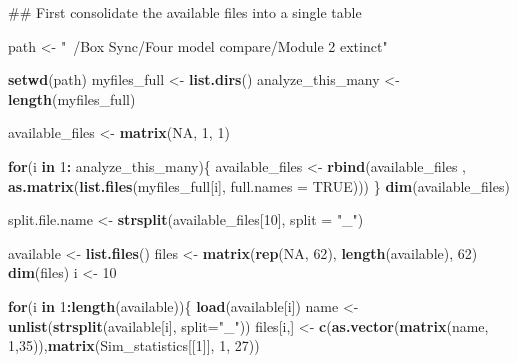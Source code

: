 \documentclass[]{book}
\newenvironment{Shaded}{\begin{snugshade}}{\end{snugshade}}
\newcommand{\KeywordTok}[1]{\textcolor[rgb]{0.13,0.29,0.53}{\textbf{{#1}}}}
\newcommand{\DataTypeTok}[1]{\textcolor[rgb]{0.13,0.29,0.53}{{#1}}}
\newcommand{\DecValTok}[1]{\textcolor[rgb]{0.00,0.00,0.81}{{#1}}}
\newcommand{\StringTok}[1]{\textcolor[rgb]{0.31,0.60,0.02}{{#1}}}
\newcommand{\OtherTok}[1]{\textcolor[rgb]{0.56,0.35,0.01}{{#1}}}
\newcommand{\ControlFlowTok}[1]{\textcolor[rgb]{0.13,0.29,0.53}{\textbf{{#1}}}}
\newcommand{\OperatorTok}[1]{\textcolor[rgb]{0.81,0.36,0.00}{\textbf{{#1}}}}
\newcommand{\NormalTok}[1]{{#1}}
\theoremstyle{definition}
\theoremstyle{definition}
\theoremstyle{remark}
\begin{document}
\begin{Shaded}
\begin{Highlighting}[]
\NormalTok{## First consolidate the available files into a single table}
    
\NormalTok{      path <-}\StringTok{ "~/Box Sync/Four model compare/Module 2 extinct"}
           
     
           \KeywordTok{setwd}\NormalTok{(path)}
\NormalTok{    myfiles_full <-}\StringTok{ }\KeywordTok{list.dirs}\NormalTok{()}
\NormalTok{    analyze_this_many <-}\StringTok{ }\KeywordTok{length}\NormalTok{(myfiles_full)}
    
\NormalTok{    available_files <-}\StringTok{ }\KeywordTok{matrix}\NormalTok{(}\OtherTok{NA}\NormalTok{, }\DecValTok{1}\NormalTok{, }\DecValTok{1}\NormalTok{)}
    
        
    \ControlFlowTok{for}\NormalTok{(i }\ControlFlowTok{in} \DecValTok{1}\OperatorTok{:}\StringTok{ }\NormalTok{analyze_this_many)\{}
\NormalTok{    available_files <-}\StringTok{ }\KeywordTok{rbind}\NormalTok{(available_files , }\KeywordTok{as.matrix}\NormalTok{(}\KeywordTok{list.files}\NormalTok{(myfiles_full[i], }\DataTypeTok{full.names =} \OtherTok{TRUE}\NormalTok{)))}
\NormalTok{    \}}
    \KeywordTok{dim}\NormalTok{(available_files)}
    
\NormalTok{    split.file.name <-}\StringTok{ }\KeywordTok{strsplit}\NormalTok{(available_files[}\DecValTok{10}\NormalTok{], }\DataTypeTok{split =} \StringTok{"_"}\NormalTok{) }
    
    
    
 
\NormalTok{available <-}\StringTok{ }\KeywordTok{list.files}\NormalTok{()}
\NormalTok{files <-}\StringTok{ }\KeywordTok{matrix}\NormalTok{(}\KeywordTok{rep}\NormalTok{(}\OtherTok{NA}\NormalTok{, }\DecValTok{62}\NormalTok{), }\KeywordTok{length}\NormalTok{(available), }\DecValTok{62}\NormalTok{)}
\KeywordTok{dim}\NormalTok{(files)}
\NormalTok{i <-}\StringTok{ }\DecValTok{10}


\ControlFlowTok{for}\NormalTok{(i }\ControlFlowTok{in} \DecValTok{1}\OperatorTok{:}\KeywordTok{length}\NormalTok{(available))\{}
\KeywordTok{load}\NormalTok{(available[i])}
\NormalTok{name <-}\StringTok{ }\KeywordTok{unlist}\NormalTok{(}\KeywordTok{strsplit}\NormalTok{(available[i], }\DataTypeTok{split=}\StringTok{"_"}\NormalTok{))}
\NormalTok{files[i,] <-}\StringTok{ }\KeywordTok{c}\NormalTok{(}\KeywordTok{as.vector}\NormalTok{(}\KeywordTok{matrix}\NormalTok{(name, }\DecValTok{1}\NormalTok{,}\DecValTok{35}\NormalTok{)),}\KeywordTok{matrix}\NormalTok{(Sim_statistics[[}\DecValTok{1}\NormalTok{]], }\DecValTok{1}\NormalTok{, }\DecValTok{27}\NormalTok{))}


\end{Highlighting}
\end{Shaded}
\end{document}
